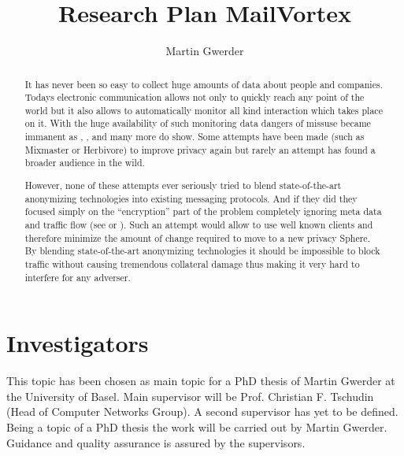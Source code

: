 \documentclass[twocolumn,a4paper,10pt,english]{scrartcl}
\begin{document}
\title{Research Plan MailVortex}
\author{Martin Gwerder}
\date{\SVNDate}

\maketitle

\begin{abstract}It has never been so easy to collect huge amounts of data about people and companies. Todays electronic communication allows not only to quickly reach any point of the world but it also allows to automatically monitor all kind interaction which takes place on it. With the huge availability of such monitoring data dangers of missuse became immanent as \cite{ECHELON}, \cite{wiki:prism}, \cite{wiki:tempora} and many more do show. Some attempts have been made (such as Mixmaster\cite{mixmaster-spec} or Herbivore\cite{herbivore:tr}) to improve privacy again but rarely an attempt has found a broader audience in the wild. \par

However, none of these attempts ever seriously tried to blend state-of-the-art anonymizing technologies into existing messaging protocols. And if they did they focused simply on the ``encryption'' part of the problem completely ignoring meta data and traffic flow (see \cite{RFC3851} or \cite{RFC2015}). Such an attempt  would allow to use well known clients and therefore minimize the amount of change required to move to a new privacy Sphere. By blending state-of-the-art anonymizing technologies it should be impossible to block traffic without causing tremendous collateral damage thus making it very hard to interfere for any adverser. 
\end{abstract}

\section{Investigators}
This topic has been chosen as main topic for a PhD thesis of Martin Gwerder at the University of Basel. Main supervisor will be Prof. Christian F. Tschudin (Head of Computer Networks Group). A second supervisor has yet to be defined. Being a topic of a PhD thesis the work will be carried out by Martin Gwerder. Guidance and quality assurance is assured by the supervisors.
\end{document}
